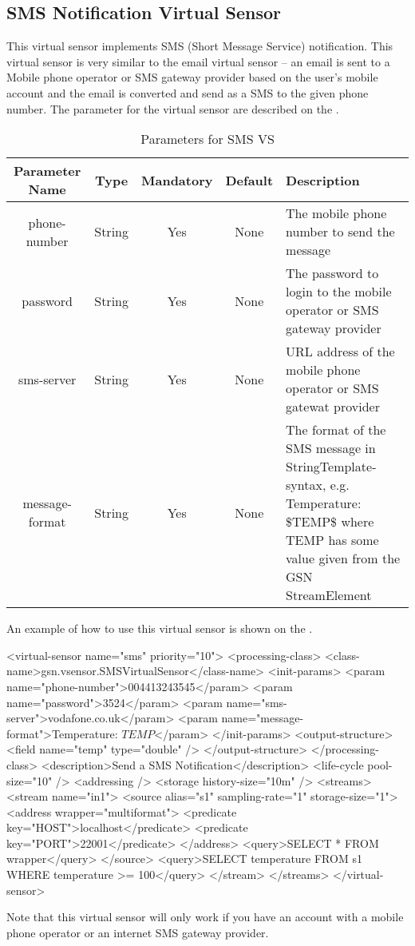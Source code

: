 \subsection{SMS Notification Virtual Sensor}

This virtual sensor implements SMS (Short Message Service) notification. This virtual sensor is very similar to the email virtual sensor – an email is sent to a Mobile phone operator or SMS gateway provider based on the user's mobile account and the email is converted and send as a SMS to the given phone number. The parameter for the virtual sensor are described on the .


\begin{table*}[!htp]
	\centering
	{\normalfont\footnotesize
	\begin{tabulary}{\textwidth}{|C|C|C|C|J|}%
	\hline
		\textbf{Parameter Name} &
		\textbf{Type} &
		\textbf{Mandatory} &
		\textbf{Default} &
		\textbf{Description} \\
	\hline
	\hline
		phone-number &
		String &	
		Yes &
		None &
		The mobile phone number to send the message \\
	\hline
		password &
		String &
		Yes &
		None &
		The password to login to the mobile operator or SMS gateway provider \\
	\hline
		sms-server &
		String &
		Yes &
		None &
		URL address of the mobile phone operator or SMS gatewat provider \\
	\hline
		message-format &
		String &
		Yes &
		None &
		The format of the SMS message in StringTemplate-syntax, e.g. Temperature: \$TEMP\$ where TEMP has some value given from the GSN StreamElement \\
	\hline
	\end{tabulary}
	}
	\caption{Parameters for SMS VS}
	\label{table:parameters_sms_vs}
\end{table*}

An example of how to use this virtual sensor is shown on the .

\begin{xmlcode}[caption={Sample of SMS Notification VSD file}, label=listing:xml:smsnotification_vsd]
<virtual-sensor name="sms" priority="10">
	<processing-class>
		<class-name>gsn.vsensor.SMSVirtualSensor</class-name>
		<init-params>
			<param name="phone-number">004413243545</param>
			<param name="password">3524</param>
			<param name="sms-server">vodafone.co.uk</param>
			<param name="message-format">Temperature: $TEMP$</param>
		</init-params>
		<output-structure>
			<field name="temp" type="double" />
		</output-structure>
	</processing-class>
	<description>Send a SMS Notification</description>
	<life-cycle pool-size="10" />
	<addressing />
	<storage history-size="10m" />
	<streams>
		<stream name="in1">
			<source alias="s1" sampling-rate="1" storage-size="1">
				<address wrapper="multiformat">
					<predicate key="HOST">localhost</predicate>
					<predicate key="PORT">22001</predicate>
				</address>
				<query>SELECT * FROM wrapper</query>
			</source>
			<query>SELECT temperature FROM s1 WHERE temperature >= 100</query>
		</stream>
	</streams>
</virtual-sensor>
\end{xmlcode}

Note that this virtual sensor will only work if you have an account with a mobile phone operator or an internet SMS gateway provider. 






